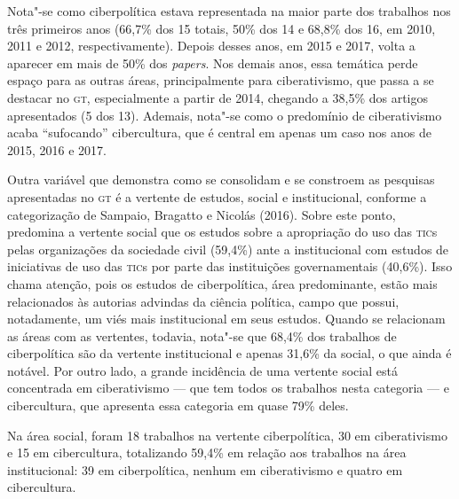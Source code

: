 { 

Nota"-se como ciberpolítica estava representada na maior parte dos
trabalhos nos três primeiros anos (66,7\% dos 15 totais, 50\% dos 14 e
68,8\% dos 16, em 2010, 2011 e 2012, respectivamente). Depois desses
anos, em 2015 e 2017, volta a aparecer em mais de 50\% dos
\textit{papers}. Nos demais anos, essa temática perde espaço para as
outras áreas, principalmente para ciberativismo, que passa a se destacar
no \textsc{gt}, especialmente a partir de 2014, chegando a 38,5\% dos artigos
apresentados (5 dos 13). Ademais, nota"-se como o predomínio de
ciberativismo acaba ``sufocando'' cibercultura, que é central em apenas
um caso nos anos de 2015, 2016 e 2017.

Outra variável que demonstra como se consolidam e se constroem as
pesquisas apresentadas no \textsc{gt} é a vertente de estudos, social e
institucional, conforme a categorização de Sampaio, Bragatto e Nicolás
(2016). Sobre este ponto, predomina a vertente social que os estudos
sobre a apropriação do uso das \textsc{tic}s pelas organizações da sociedade
civil (59,4\%) ante a institucional com estudos de iniciativas de uso
das \textsc{tic}s por parte das instituições governamentais (40,6\%). Isso chama
atenção, pois os estudos de ciberpolítica, área predominante, estão mais
relacionados às autorias advindas da ciência política, campo que possui,
notadamente, um viés mais institucional em seus estudos. Quando se
relacionam as áreas com as vertentes, todavia, nota"-se que 68,4\% dos
trabalhos de ciberpolítica são da vertente institucional e apenas 31,6\%
da social, o que ainda é notável. Por outro lado, a grande incidência de
uma vertente social está concentrada em ciberativismo --- que tem todos
os trabalhos nesta categoria --- e cibercultura, que apresenta essa
categoria em quase 79\% deles.

Na área social, foram 18 trabalhos na vertente ciberpolítica, 30 em ciberativismo e 15 em cibercultura, totalizando 59,4\% em relação aos trabalhos na área institucional: 39 em ciberpolítica, nenhum em ciberativismo e quatro em cibercultura.

}
